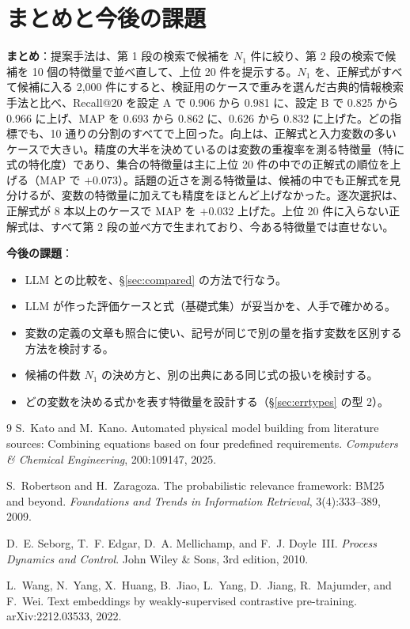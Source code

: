 \documentclass[11pt,a4paper]{ltjsarticle}
\begin{document}
\section{まとめと今後の課題}\label{sec:summary}
\textbf{まとめ}：提案手法は、第 1 段の検索で候補を $N_1$ 件に絞り、第 2 段の検索で候補を 10 個の特徴量で並べ直して、上位 20 件を提示する。$N_1$ を、正解式がすべて候補に入る 2{,}000 件にすると、検証用のケースで重みを選んだ古典的情報検索手法と比べ、Recall@20 を設定 A で 0.906 から 0.981 に、設定 B で 0.825 から 0.966 に上げ、MAP を 0.693 から 0.862 に、0.626 から 0.832 に上げた。どの指標でも、10 通りの分割のすべてで上回った。向上は、正解式と入力変数の多いケースで大きい。精度の大半を決めているのは変数の重複率を測る特徴量（特に式の特化度）であり、集合の特徴量は主に上位 20 件の中での正解式の順位を上げる（MAP で $+0.073$）。話題の近さを測る特徴量は、候補の中でも正解式を見分けるが、変数の特徴量に加えても精度をほとんど上げなかった。逐次選択は、正解式が 8 本以上のケースで MAP を $+0.032$ 上げた。上位 20 件に入らない正解式は、すべて第 2 段の並べ方で生まれており、今ある特徴量では直せない。

\textbf{今後の課題}：
\begin{itemize}[leftmargin=1.5em]
  \item LLM との比較を、\S\ref{sec:compared} の方法で行なう。
  \item LLM が作った評価ケースと式（基礎式集）が妥当かを、人手で確かめる。
  \item 変数の定義の文章も照合に使い、記号が同じで別の量を指す変数を区別する方法を検討する。
  \item 候補の件数 $N_1$ の決め方と、別の出典にある同じ式の扱いを検討する。
  \item どの変数を決める式かを表す特徴量を設計する（\S\ref{sec:errtypes} の型 2）。
\end{itemize}

\begin{thebibliography}{9}
S.~Kato and M.~Kano.
\newblock Automated physical model building from literature sources: Combining equations based on four predefined requirements.
\newblock \emph{Computers \& Chemical Engineering}, 200:109147, 2025.

S.~Robertson and H.~Zaragoza.
\newblock The probabilistic relevance framework: BM25 and beyond.
\newblock \emph{Foundations and Trends in Information Retrieval}, 3(4):333--389, 2009.

D.~E. Seborg, T.~F. Edgar, D.~A. Mellichamp, and F.~J. Doyle~III.
\newblock \emph{Process Dynamics and Control}.
\newblock John Wiley \& Sons, 3rd edition, 2010.

L.~Wang, N.~Yang, X.~Huang, B.~Jiao, L.~Yang, D.~Jiang, R.~Majumder, and F.~Wei.
\newblock Text embeddings by weakly-supervised contrastive pre-training.
\newblock arXiv:2212.03533, 2022.
\end{thebibliography}
\end{document}

